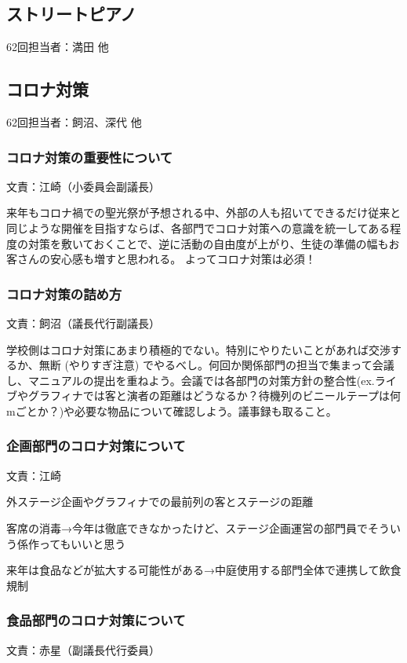 \documentclass[dvipdfmx,jb5]{jarticle}
\begin{document}
 \subsection{ストリートピアノ}
62回担当者：満田 他

 \subsection{コロナ対策}
62回担当者：飼沼、深代 他

\subsubsection{コロナ対策の重要性について} 文責：江崎（小委員会副議長） \vspace{2mm}

来年もコロナ禍での聖光祭が予想される中、外部の人も招いてできるだけ従来と同じような開催を目指すならば、各部門でコロナ対策への意識を統一してある程度の対策を敷いておくことで、逆に活動の自由度が上がり、生徒の準備の幅もお客さんの安心感も増すと思われる。
よってコロナ対策は必須！

\subsubsection{コロナ対策の詰め方} 文責：飼沼（議長代行副議長） \vspace{2mm}

学校側はコロナ対策にあまり積極的でない。特別にやりたいことがあれば交渉するか、無断 (やりすぎ注意) でやるべし。何回か関係部門の担当で集まって会議し、マニュアルの提出を重ねよう。会議では各部門の対策方針の整合性(ex.ライブやグラフィナでは客と演者の距離はどうなるか？待機列のビニールテープは何mごとか？)や必要な物品について確認しよう。議事録も取ること。

\subsubsection{企画部門のコロナ対策について} 文責：江崎 \vspace{2mm}

外ステージ企画やグラフィナでの最前列の客とステージの距離

客席の消毒→今年は徹底できなかったけど、ステージ企画運営の部門員でそういう係作ってもいいと思う

来年は食品などが拡大する可能性がある→中庭使用する部門全体で連携して飲食規制

\subsubsection{食品部門のコロナ対策について} 文責：赤星（副議長代行委員） \vspace{2mm}
\end{document}
